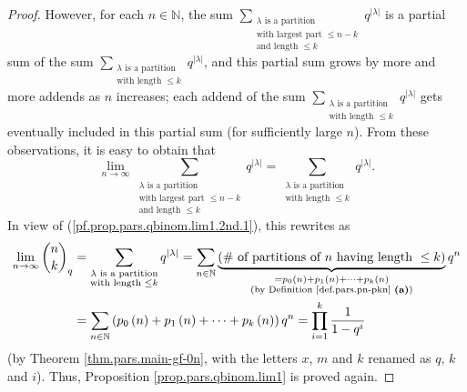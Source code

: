 \begin{proof}
However, for each $n\in\mathbb{N}$, the sum $\sum_{\substack{\lambda\text{ is
a partition}\\\text{with largest part }\leq n-k\\\text{and length }\leq
k}}q^{\left\vert \lambda\right\vert }$ is a partial sum of the sum
$\sum_{\substack{\lambda\text{ is a partition}\\\text{with length }\leq
k}}q^{\left\vert \lambda\right\vert }$, and this partial sum grows by more and
more addends as $n$ increases; each addend of the sum $\sum_{\substack{\lambda
\text{ is a partition}\\\text{with length }\leq k}}q^{\left\vert
\lambda\right\vert }$ gets eventually included in this partial sum (for
sufficiently large $n$). From these observations, it is easy to obtain that%
\[
\lim\limits_{n\rightarrow\infty}\sum_{\substack{\lambda\text{ is a
partition}\\\text{with largest part }\leq n-k\\\text{and length }\leq
k}}q^{\left\vert \lambda\right\vert }=\sum_{\substack{\lambda\text{ is a
partition}\\\text{with length }\leq k}}q^{\left\vert \lambda\right\vert }.
\]
In view of (\ref{pf.prop.pars.qbinom.lim1.2nd.1}), this rewrites as%
\begin{align*}
\lim\limits_{n\rightarrow\infty}\dbinom{n}{k}_{q}  &  =\sum_{\substack{\lambda
\text{ is a partition}\\\text{with length }\leq k}}q^{\left\vert
\lambda\right\vert }=\sum_{n\in\mathbb{N}}\underbrace{\left(  \text{\# of
partitions of }n\text{ having length }\leq k\right)  }_{\substack{=p_{0}%
\left(  n\right)  +p_{1}\left(  n\right)  +\cdots+p_{k}\left(  n\right)
\\\text{(by Definition \ref{def.pars.pn-pkn} \textbf{(a)})}}}q^{n}\\
&  =\sum_{n\in\mathbb{N}}\left(  p_{0}\left(  n\right)  +p_{1}\left(
n\right)  +\cdots+p_{k}\left(  n\right)  \right)  q^{n}=\prod_{i=1}^{k}%
\dfrac{1}{1-q^{i}}%
\end{align*}
(by Theorem \ref{thm.pars.main-gf-0n}, with the letters $x$, $m$ and $k$
renamed as $q$, $k$ and $i$). Thus, Proposition \ref{prop.pars.qbinom.lim1} is
proved again.
\end{proof}
